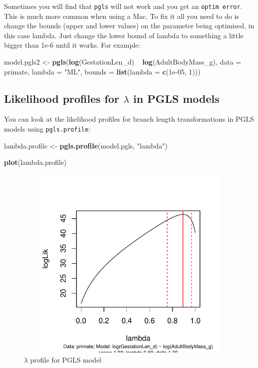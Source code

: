 \documentclass[12pt]{article}
\newcommand{\KeywordTok}[1]{\textcolor[rgb]{0.13,0.29,0.53}{\textbf{{#1}}}}
\newcommand{\DataTypeTok}[1]{\textcolor[rgb]{0.13,0.29,0.53}{{#1}}}
\newcommand{\DecValTok}[1]{\textcolor[rgb]{0.00,0.00,0.81}{{#1}}}
\newcommand{\FloatTok}[1]{\textcolor[rgb]{0.00,0.00,0.81}{{#1}}}
\newcommand{\StringTok}[1]{\textcolor[rgb]{0.31,0.60,0.02}{{#1}}}
\newcommand{\NormalTok}[1]{{#1}}
\begin{document}
\newpage
\begin{framed}
Sometimes you will find that \texttt{pgls} will not work and you get an \texttt{optim error}. This is much more common when using a Mac. To fix it all you need to do is change the bounds (upper and lower values) on the parameter being optimised, in this case lambda. Just change the lower bound of lambda to something a little bigger than 1e-6 until it works. For example:

\begin{snugshade}
\begin{Highlighting}[]
\NormalTok{model.pgls2 <-}\StringTok{ }\KeywordTok{pgls}\NormalTok{(}\KeywordTok{log}\NormalTok{(GestationLen_d) ~}\StringTok{ }\KeywordTok{log}\NormalTok{(AdultBodyMass_g), }
                    \DataTypeTok{data =} \NormalTok{primate, }\DataTypeTok{lambda =} \StringTok{"ML"}\NormalTok{, }
                    \DataTypeTok{bounds =} \KeywordTok{list}\NormalTok{(}\DataTypeTok{lambda =} \KeywordTok{c}\NormalTok{(}\FloatTok{1e-05}\NormalTok{, }\DecValTok{1}\NormalTok{)))}
\end{Highlighting}
\end{snugshade}
\end{framed}

\subsection{Likelihood profiles for $\lambda$ in PGLS models}

You can look at the likelihood profiles for branch length transformations in PGLS models using \texttt{pgls.profile}:

\begin{snugshade}
\begin{Highlighting}[]
\NormalTok{lambda.profile <-}\StringTok{ }\KeywordTok{pgls.profile}\NormalTok{(model.pgls, }\StringTok{"lambda"}\NormalTok{)}

\KeywordTok{plot}\NormalTok{(lambda.profile)}
\end{Highlighting}
\end{snugshade}

\begin{figure}[H]
\centering
\includegraphics[width = 30cm, height = 9.5cm, keepaspectratio=true]{lambdaplot.pdf}
\caption{$\lambda$ profile for PGLS model}
\label{figure}
\end{figure}
\end{document}

